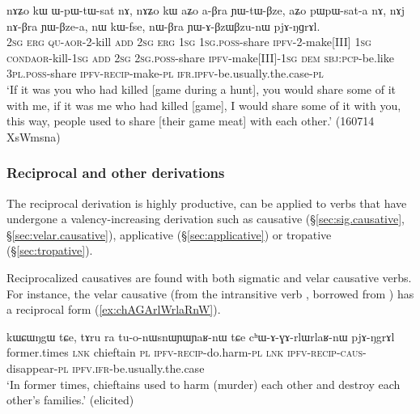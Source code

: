 \begin{exe}
	\ex \label{ex:nWBra.YABzWBzunW}
	\gll nɤʑo kɯ ɯ-pɯ-tɯ-sat nɤ, nɤʑo kɯ aʑo a-βra ɲɯ-tɯ-βze, aʑo pɯ\redp{}pɯ-sat-a nɤ, nɤj nɤ-βra ɲɯ-βze-a, nɯ kɯ-fse, nɯ-βra ɲɯ-ɤ-βzɯ\redp{}βzu-nɯ pjɤ-ŋɡrɤl. \\
	\textsc{2sg} \textsc{erg} \textsc{qu}-\textsc{aor}-2-kill \textsc{add} 	\textsc{2sg} \textsc{erg} \textsc{1sg} \textsc{1sg}.\textsc{poss}-share \textsc{ipfv}-2-make[III] \textsc{1sg} \textsc{cond}\redp{}\textsc{aor}-kill-\textsc{1sg} \textsc{add} \textsc{2sg} \textsc{2sg}.\textsc{poss}-share \textsc{ipfv}-make[III]-\textsc{1sg} \textsc{dem} \textsc{sbj}:\textsc{pcp}-be.like \textsc{3pl}.\textsc{poss}-share \textsc{ipfv}-\textsc{recip}-make-\textsc{pl} \textsc{ifr}.\textsc{ipfv}-be.usually.the.case-\textsc{pl} \\
	\glt `If it was you who had killed [game during a hunt], you would share some of it with me, if it was me who had killed [game], I would share some of it with you, this way, people used to share [their game meat] with each other.' (160714 XsWmsna)
\end{exe}

\subsubsection{Reciprocal and other derivations} \label{sec:reciprocal.other}
The reciprocal derivation is highly productive, can be applied to verbs that have undergone a valency-increasing derivation such as causative (§\ref{sec:sig.causative}, §\ref{sec:velar.causative}), applicative (§\ref{sec:applicative}) or tropative (§\ref{sec:tropative}). 

Reciprocalized causatives are found with both sigmatic and velar causative verbs. For instance, the velar causative  (from the intransitive verb , borrowed from ) has a reciprocal form  (\ref{ex:chAGArlWrlaRnW}).

 \begin{exe}
\ex \label{ex:chAGArlWrlaRnW}
\gll kɯɕɯŋgɯ tɕe, tɤru ra tu-o-nɯsnɯɲɯ\redp{}ɲaʁ-nɯ tɕe cʰɯ-ɤ-ɣɤ-rlɯ\redp{}rlaʁ-nɯ pjɤ-ŋgrɤl \\
former.times \textsc{lnk} chieftain \textsc{pl} \textsc{ipfv}-\textsc{recip}-do.harm-\textsc{pl} \textsc{lnk} \textsc{ipfv}-\textsc{recip}-\textsc{caus}-disappear-\textsc{pl} \textsc{ipfv}.\textsc{ifr}-be.usually.the.case \\
\glt `In former times, chieftains used to harm (murder) each other and destroy each other's families.' (elicited)
\end{exe}

